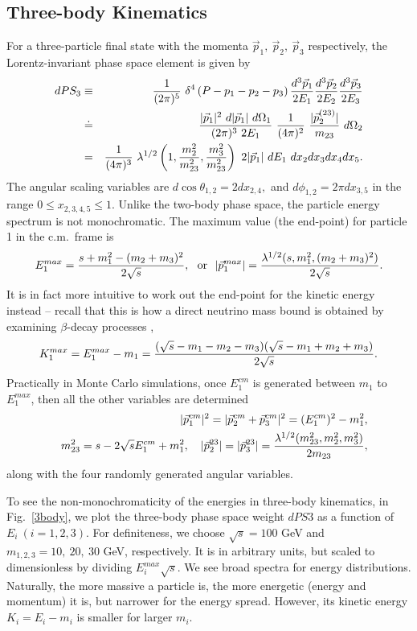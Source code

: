\documentclass[prd,aps,floats,preprintnumbers,preprint,superscriptaddress,floatfix,nofootinbib]{revtex4}
\def\vp{{\vec p}}
\def\bea{\begin{eqnarray}}
\def\eea{\end{eqnarray}}
\begin{document}
\subsection{Three-body Kinematics}
\label{three-body}
For a three-particle final state with the momenta 
$\vp_1,\ \vp_2,\ \vp_3$ respectively, 
the Lorentz-invariant phase space element  is given by
\bea
\nonumber
dPS_3 &\equiv&  {1\over (2\pi)^5}\ 
\delta^4\left(P- p_1-p_2-p_3 \right) {d^3\vec p_1\over 2E_1}
  {d^3\vec p_2\over 2E_2}   {d^3\vec p_3\over 2E_3} \\
 &\doteq & {|\vp_1|^2\ d|\vp_1|\  d\Omega_1 \over (2\pi)^3\ 2E_1}\ 
 {1\over (4\pi)^2}\  {|\vp_2^{(23)}|\over m_{23}} \ d\Omega_2\\
 &= & {1\over (4\pi)^3}\ 
  \lambda^{1/2}\left(1,{m_2^2\over m^2_{23}},{m_3^2\over m^2_{23}}\right)\ {2 |\vp_1| }\ 
 dE_1\  dx_2 dx_3 dx_4 dx_5.
\eea
The angular scaling variables are  $d\cos\theta_{1,2}=2dx_{2,4},$
and $d\phi_{1,2}=2\pi dx_{3,5}$ in  the range $0\le x_{2,3,4,5} \le 1$.
Unlike the two-body phase space, the particle energy spectrum is not
monochromatic. The maximum value (the end-point) for particle 1 in the 
c.m.~frame is 
\bea
E_1^{max}={s+m_1^2-(m_2+m_3)^2\over 2\sqrt s} ,\ \  {\rm or}\ \ 
|\vp_1^{max}| ={\lambda^{1/2}(s,m_1^2,(m_2+m_3)^2)\over 2\sqrt s}.
\eea
It is in fact more intuitive to work out the end-point for the kinetic energy
instead -- recall that this is how a direct neutrino mass bound is obtained
by examining $\beta$-decay processes \cite{PDG},
\bea
K_1^{max}= E_1^{max} - m_1 = 
{(\sqrt s-m_1-m_2-m_3) (\sqrt s-m_1+m_2+m_3) \over 2\sqrt s}.
\eea
Practically in Monte Carlo simulations, once $E_1^{cm}$ is generated
between $m_1$ to $E_1^{max}$, then all the other variables are determined
\bea
\nonumber
&& |\vp_1^{cm}|^2 = |\vp_2^{cm}+\vp_3^{cm}|^2 = (E_1^{cm})^2 - m_1^2, \\ 
&& m_{23}^2 = s - 2\sqrt s E_1^{cm} + m_1^2,\quad 
|\vp_2^{23}| = |\vp_3^{23}|={\lambda^{1/2}(m_{23}^2,m_2^2,m_3^2)\over 2 m_{23}},
\nonumber
\eea
along with the four randomly generated angular variables.

To see the non-monochromaticity of the energies in three-body 
kinematics, in Fig.~\ref{3body}, we plot the three-body phase space 
weight $dPS3$ as a function of $E_i\ (i=1,2,3)$.
For definiteness, we choose $\sqrt s=100$ GeV and $m_{1,2,3}=10,\ 20,\ 30$
GeV, respectively. It is in arbitrary units, but scaled to dimensionless by
dividing $E_i^{max} \sqrt s$. We see broad spectra for  energy distributions. 
Naturally, the more massive a particle is, the more energetic 
(energy and momentum) it is, but narrower for the energy spread.  
However, its kinetic energy $K_i=E_i-m_i$ is smaller for larger $m_i$.
\end{document}
